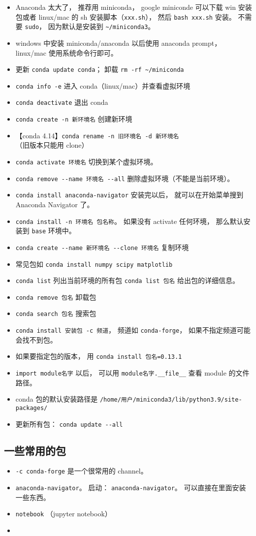 
\begin{itemize}
\item Anaconda 太大了， 推荐用 miniconda， google miniconde 可以下载 win 安装包或者 linux/mac 的 sh 安装脚本（\verb|xxx.sh|）， 然后 \verb|bash xxx.sh| 安装。 不需要 \verb|sudo|， 因为默认是安装到 \verb|~/miniconda3|。
\item windows 中安装 miniconda/anaconda 以后使用 anaconda prompt， linux/mac 使用系统命令行即可。
\item 更新 \verb|conda update conda|； 卸载 \verb|rm -rf ~/miniconda|
\item \verb|conda info -e| 进入 conda（linux/mac）并查看虚拟环境
\item \verb|conda deactivate| 退出 conda
\item \verb|conda create -n 新环境名| 创建新环境
\item 【conda 4.14】\verb|conda rename -n 旧环境名 -d 新环境名| （旧版本只能用 clone）
\item \verb|conda activate 环境名| 切换到某个虚拟环境。
\item \verb|conda remove --name 环境名 --all| 删除虚拟环境（不能是当前环境）。
\item \verb|conda install anaconda-navigator| 安装完以后， 就可以在开始菜单搜到 Anaconda Navigator 了。
\item \verb|conda install -n 环境名 包名称|。 如果没有 activate 任何环境， 那么默认安装到 \verb|base| 环境中。
\item \verb|conda create --name 新环境名 --clone 环境名| 复制环境
\item 常见包如 \verb|conda install numpy scipy matplotlib|
\item \verb|conda list| 列出当前环境的所有包 \verb|conda list 包名| 给出包的详细信息。
\item \verb|conda remove 包名| 卸载包
\item \verb|conda search 包名| 搜索包
\item \verb|conda install 安装包 -c 频道|， 频道如 \verb|conda-forge|， 如果不指定频道可能会找不到包。
\item 如果要指定包的版本， 用 \verb|conda install 包名=0.13.1|
\item \verb|import module名字| 以后， 可以用 \verb|module名字.__file__| 查看 module 的文件路径。
\item conda 包的默认安装路径是 \verb|/home/用户/miniconda3/lib/python3.9/site-packages/|
\item 更新所有包： \verb|conda update --all|
\end{itemize}

\subsection{一些常用的包}
\begin{itemize}
\item \verb|-c conda-forge| 是一个很常用的 channel。
\item \verb|anaconda-navigator|。 启动： \verb|anaconda-navigator|。 可以直接在里面安装一些东西。
\item \verb|notebook| （jupyter notebook）
\item 
\end{itemize}
